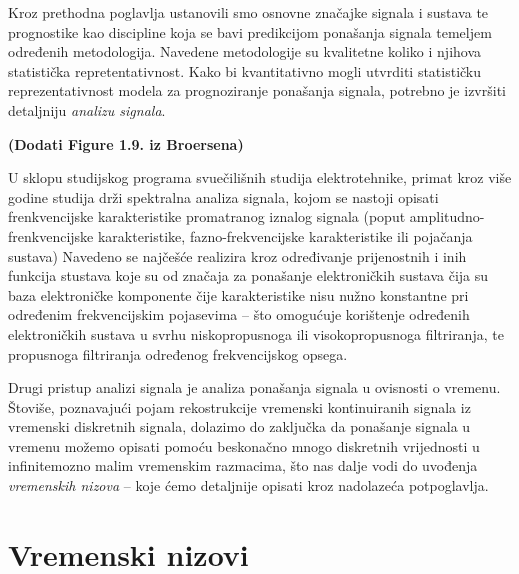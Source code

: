 \documentclass[a4paper,12pt,oneside]{memoir}
\begin{document}

        Kroz prethodna poglavlja ustanovili smo osnovne značajke signala i sustava te prognostike kao discipline koja se bavi predikcijom ponašanja signala temeljem određenih metodologija. Navedene metodologije su kvalitetne koliko i njihova statistička repretentativnost. Kako bi kvantitativno mogli utvrditi statističku reprezentativnost modela za prognoziranje ponašanja signala, potrebno je izvršiti detaljniju \textit{analizu signala}.

        \textbf{(Dodati Figure 1.9. iz Broersena)}
        
        U sklopu studijskog programa svuečilišnih studija elektrotehnike, primat kroz više godine studija drži spektralna analiza signala, kojom se nastoji opisati frenkvencijske karakteristike promatranog iznalog signala (poput amplitudno-frenkvencijske karakteristike, fazno-frekvencijske karakteristike ili pojačanja sustava) Navedeno se najčešće realizira kroz određivanje prijenostnih i inih funkcija stustava koje su od značaja za ponašanje elektroničkih sustava čija su baza elektroničke komponente čije karakteristike nisu nužno konstantne pri određenim frekvencijskim pojasevima -- što omogućuje korištenje određenih elektroničkih sustava u svrhu niskopropusnoga ili visokopropusnoga filtriranja, te propusnoga filtriranja određenog frekvencijskog opsega.

        
        Drugi pristup analizi signala je analiza ponašanja signala u ovisnosti o vremenu. Štoviše, poznavajući pojam rekostrukcije vremenski kontinuiranih signala iz vremenski diskretnih signala, dolazimo do zaključka da ponašanje signala u vremenu možemo opisati pomoću beskonačno mnogo diskretnih vrijednosti u infinitemozno malim vremenskim razmacima, što nas dalje vodi do uvođenja \textit{vremenskih nizova} -- koje ćemo detaljnije opisati kroz nadolazeća potpoglavlja.



        \section{Vremenski nizovi}
\end{document}
